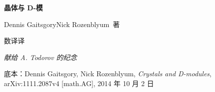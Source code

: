 \thispagestyle{empty}
\begin{center}
\vspace*{3cm}

{\Huge\bfseries 晶体与 D-模}

\vspace{1.2cm}

{\Large Dennis Gaitsgory\quad Nick Rozenblyum\ 著}

\vspace{0.6cm}

{\large 数译\hspace{0.6em}译}

\vspace{2.4cm}

{\large\itshape 献给 A. Todorov 的纪念}

\vfill

{\small 底本：Dennis Gaitsgory, Nick Rozenblyum, \emph{Crystals and D-modules},\\
arXiv:1111.2087v4 [math.AG], 2014 年 10 月 2 日}

\vspace{0.6cm}
\end{center}
\clearpage
